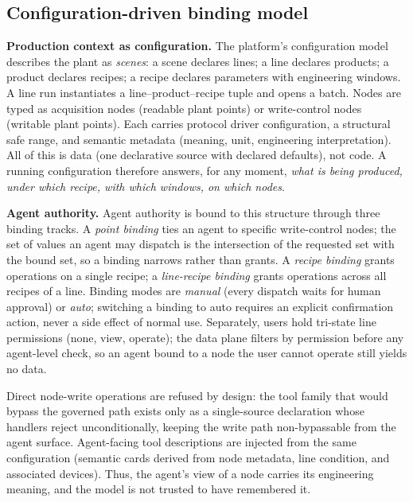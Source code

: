 \subsection{Configuration-driven binding model}
\label{sec:arch-binding}

\textbf{Production context as configuration.} The platform's configuration
model describes the plant as \emph{scenes}: a scene declares lines; a line
declares products; a product declares recipes; a recipe declares
parameters with engineering windows. A line run instantiates a
line--product--recipe tuple and opens a batch. Nodes are typed as
acquisition nodes (readable plant points) or write-control nodes
(writable plant points). Each carries protocol driver configuration, a
structural safe range, and semantic metadata (meaning, unit, engineering
interpretation). All of this is data (one declarative source with
declared defaults), not code. A running configuration therefore answers,
for any moment, \emph{what is being produced, under which recipe, with
which windows, on which nodes}.

\textbf{Agent authority.} Agent authority is bound to this structure
through three binding tracks. A \emph{point binding} ties an agent to
specific write-control nodes; the set of values an agent may dispatch is
the intersection of the requested set with the bound set, so a binding
narrows rather than grants. A \emph{recipe binding} grants operations on a
single recipe; a \emph{line-recipe binding} grants operations across all
recipes of a line. Binding modes are \emph{manual} (every dispatch waits
for human approval) or \emph{auto}; switching a binding to auto requires an
explicit confirmation action, never a side effect of normal use.
Separately, users hold tri-state line permissions (none, view, operate);
the data plane filters by permission before any agent-level check, so an
agent bound to a node the user cannot operate still yields no data.

Direct node-write operations are refused by design: the tool family that
would bypass the governed path exists only as a single-source declaration
whose handlers reject unconditionally, keeping the write path non-bypassable
from the agent surface. Agent-facing tool descriptions are injected from
the same configuration (semantic cards derived from node metadata, line
condition, and associated devices). Thus, the agent's view of a node
carries its engineering meaning, and the model is not trusted to have
remembered it.

